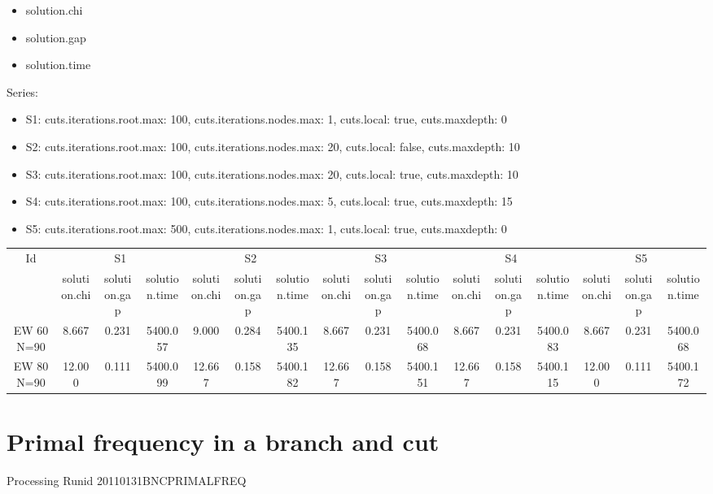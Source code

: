 \documentclass[landscape, 12pt]{report}
\begin{document}
\begin{itemize}
\item solution.chi
\item solution.gap
\item solution.time
\end{itemize}
Series:
\begin{itemize}
\item S1: cuts.iterations.root.max: 100, cuts.iterations.nodes.max: 1, cuts.local: true, cuts.maxdepth: 0
\item S2: cuts.iterations.root.max: 100, cuts.iterations.nodes.max: 20, cuts.local: false, cuts.maxdepth: 10
\item S3: cuts.iterations.root.max: 100, cuts.iterations.nodes.max: 20, cuts.local: true, cuts.maxdepth: 10
\item S4: cuts.iterations.root.max: 100, cuts.iterations.nodes.max: 5, cuts.local: true, cuts.maxdepth: 15
\item S5: cuts.iterations.root.max: 500, cuts.iterations.nodes.max: 1, cuts.local: true, cuts.maxdepth: 0
\end{itemize}
\begin{tabular}{|c|ccc|ccc|ccc|ccc|ccc|}
\hline
\multicolumn{1}{|c|}{Id} & \multicolumn{3}{|c|}{S1} & \multicolumn{3}{|c|}{S2} & \multicolumn{3}{|c|}{S3} & \multicolumn{3}{|c|}{S4} & \multicolumn{3}{|c|}{S5}
\\
 & solution.chi & solution.gap & solution.time & solution.chi & solution.gap & solution.time & solution.chi & solution.gap & solution.time & solution.chi & solution.gap & solution.time & solution.chi & solution.gap & solution.time
\\
\hline
EW 60 N=90 & 8.667 & 0.231 & 5400.057 & 9.000 & 0.284 & 5400.135 & 8.667 & 0.231 & 5400.068 & 8.667 & 0.231 & 5400.083 & 8.667 & 0.231 & 5400.068
\\
EW 80 N=90 & 12.000 & 0.111 & 5400.099 & 12.667 & 0.158 & 5400.182 & 12.667 & 0.158 & 5400.151 & 12.667 & 0.158 & 5400.115 & 12.000 & 0.111 & 5400.172
\\
\hline 
 \end{tabular}

\clearpage

\section{Primal frequency in a branch and cut}

Processing Runid 20110131BNCPRIMALFREQ
\end{document}
